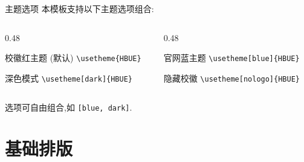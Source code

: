 \documentclass[aspectratio=169, 10pt, UTF8]{ctexbeamer}
\begin{document}
\begin{frame}{主题选项}
  本模板支持以下主题选项组合:
  \vspace{0.5em}
  \begin{columns}[T]
    \begin{column}{0.48\textwidth}
      \begin{exampleblock}{校徽红主题 (默认)}
        \texttt{\textbackslash usetheme\{HBUE\}}
      \end{exampleblock}
      \begin{exampleblock}{深色模式}
        \texttt{\textbackslash usetheme[dark]\{HBUE\}}
      \end{exampleblock}
    \end{column}
    \begin{column}{0.48\textwidth}
      \begin{exampleblock}{官网蓝主题}
        \texttt{\textbackslash usetheme[blue]\{HBUE\}}
      \end{exampleblock}
      \begin{exampleblock}{隐藏校徽}
        \texttt{\textbackslash usetheme[nologo]\{HBUE\}}
      \end{exampleblock}
    \end{column}
  \end{columns}
  \vspace{0.5em}
  选项可自由组合,如 \texttt{[blue, dark]}.
\end{frame}

\section{基础排版}
\end{document}
